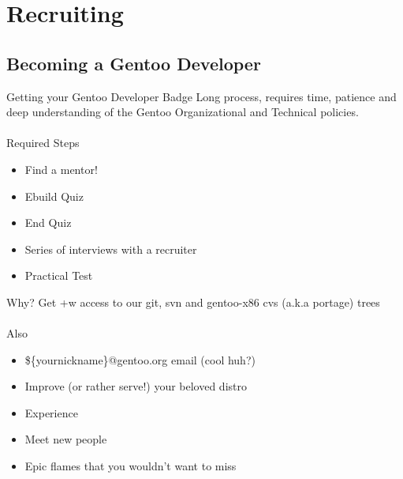 \section{Recruiting}

\subsection{Becoming a Gentoo Developer}
\begin{frame}{Getting your Gentoo Developer Badge}
Long process, requires time, patience and deep understanding of the Gentoo Organizational and Technical policies.
\\~\\
Required Steps
	\begin{itemize}
		\item Find a mentor!
		\item Ebuild Quiz
		\item End Quiz
		\item Series of interviews with a recruiter
		\item Practical Test
	\end{itemize}
\end{frame}

\begin{frame}{Why?}
Get +w access to our git, svn and gentoo-x86 cvs (a.k.a portage) trees
\\~\\
Also
	\begin{itemize}
		\item \$\{yournickname\}@gentoo.org email (cool huh?)
		\item Improve (or rather serve!) your beloved distro
		\item Experience
		\item Meet new people
		\item Epic flames that you wouldn't want to miss
	\end{itemize}
\end{frame}

